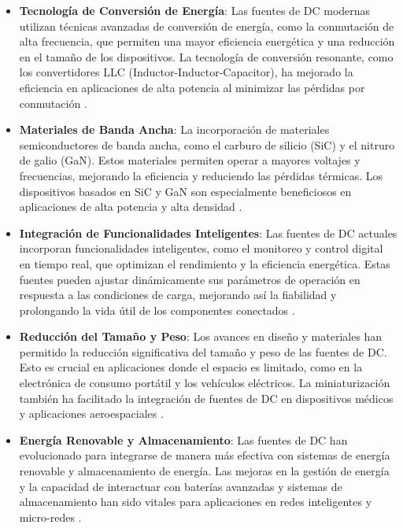 \begin{itemize}
    \item \textbf{Tecnología de Conversión de Energía}: Las fuentes de DC modernas utilizan técnicas avanzadas de conversión de energía, como la conmutación de alta frecuencia, que permiten una mayor eficiencia energética y una reducción en el tamaño de los dispositivos. La tecnología de conversión resonante, como los convertidores LLC (Inductor-Inductor-Capacitor), ha mejorado la eficiencia en aplicaciones de alta potencia al minimizar las pérdidas por conmutación \cite{zhang2013}.
    \item \textbf{Materiales de Banda Ancha}: La incorporación de materiales semiconductores de banda ancha, como el carburo de silicio (SiC) y el nitruro de galio (GaN). Estos materiales permiten operar a mayores voltajes y frecuencias, mejorando la eficiencia y reduciendo las pérdidas térmicas. Los dispositivos basados en SiC y GaN son especialmente beneficiosos en aplicaciones de alta potencia y alta densidad \cite{palmour2019}.
    \item \textbf{Integración de Funcionalidades Inteligentes}: Las fuentes de DC actuales incorporan funcionalidades inteligentes, como el monitoreo y control digital en tiempo real, que optimizan el rendimiento y la eficiencia energética. Estas fuentes pueden ajustar dinámicamente sus parámetros de operación en respuesta a las condiciones de carga, mejorando así la fiabilidad y prolongando la vida útil de los componentes conectados \cite{brown2020}.
    \item \textbf{Reducción del Tamaño y Peso}: Los avances en diseño y materiales han permitido la reducción significativa del tamaño y peso de las fuentes de DC. Esto es crucial en aplicaciones donde el espacio es limitado, como en la electrónica de consumo portátil y los vehículos eléctricos. La miniaturización también ha facilitado la integración de fuentes de DC en dispositivos médicos y aplicaciones aeroespaciales \cite{kumar2017}.
    \item \textbf{Energía Renovable y Almacenamiento}: Las fuentes de DC han evolucionado para integrarse de manera más efectiva con sistemas de energía renovable y almacenamiento de energía. Las mejoras en la gestión de energía y la capacidad de interactuar con baterías avanzadas y sistemas de almacenamiento han sido vitales para aplicaciones en redes inteligentes y micro-redes \cite{hoffmann2021}.
\end{itemize}\par 
